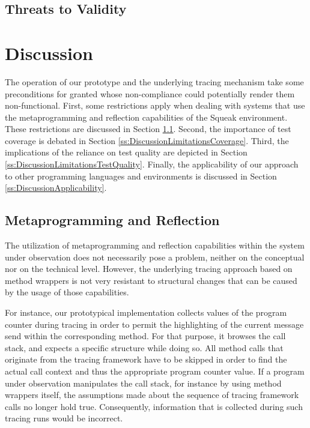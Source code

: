 \subsection{Threats to Validity}
\label{ss:DiscussionEvaluationThreats}

\clearpage
\section{Discussion}
\label{s:DiscussionLimitations}
The operation of our prototype and the underlying tracing mechanism take some preconditions for granted whose non-compliance could potentially render them non-functional.
First, some restrictions apply when dealing with systems that use the metaprogramming and reflection capabilities of the Squeak environment.
These restrictions are discussed in Section \ref{ss:DiscussionLimitationsMeta}.
Second, the importance of test coverage is debated in Section \ref{ss:DiscussionLimitationsCoverage}.
Third, the implications of the reliance on test quality are depicted in Section \ref{ss:DiscussionLimitationsTestQuality}.
Finally, the applicability of our approach to other programming languages and environments is discussed in Section \ref{ss:DiscussionApplicability}.

\subsection{Metaprogramming and Reflection}
\label{ss:DiscussionLimitationsMeta}
The utilization of metaprogramming and reflection capabilities within the system under observation does not necessarily pose a problem, neither on the conceptual nor on the technical level.
However, the underlying tracing approach based on method wrappers is not very resistant to structural changes that can be caused by the usage of those capabilities.

For instance, our prototypical implementation collects values of the program counter during tracing in order to permit the highlighting of the current message send within the corresponding method.
For that purpose, it browses the call stack, and expects a specific structure while doing so.
All method calls that originate from the tracing framework have to be skipped in order to find the actual call context and thus the appropriate program counter value.
If a program under observation manipulates the call stack, for instance by using method wrappers itself, the assumptions made about the sequence of tracing framework calls no longer hold true.
Consequently, information that is collected during such tracing runs would be incorrect.

